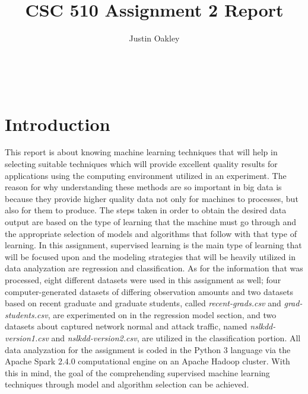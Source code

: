 \documentclass[a4paper,12pt]{IEEEtran}
\begin{document}
\title{CSC 510 Assignment 2 Report}
\author{Justin Oakley}
\maketitle\

\tableofcontents
\newpage

\section{Introduction}
This report is about knowing machine learning techniques that will help in selecting suitable techniques which will provide excellent quality results for applications using the computing environment utilized in an experiment. The reason for why understanding these methods are so important in big data is because they provide higher quality data not only for machines to processes, but also for them to produce. The steps taken in order to obtain the desired data output are based on the type of learning that the machine must go through and the appropriate selection of models and algorithms that follow with that type of learning. In this assignment, supervised learning is the main type of learning that will be focused upon and the modeling strategies that will be heavily utilized in data analyzation are regression and classification. As for the information that was processed, eight different datasets were used in this assignment as well; four computer-generated datasets of differing observation amounts and two datasets based on recent graduate and graduate students, called \textit{recent-grads.csv} and \textit{grad-students.csv}, are experimented on in the regression model section, and two datasets about captured network normal and attack traffic, named \textit{nslkdd-version1.csv} and \textit{nslkdd-version2.csv}, are utilized in the classification portion. All data analyzation for the assignment is coded in the Python 3 language via the Apache Spark 2.4.0 computational engine on an Apache Hadoop cluster. With this in mind, the goal of the comprehending supervised machine learning techniques through model and algorithm selection can be achieved.
\end{document}
